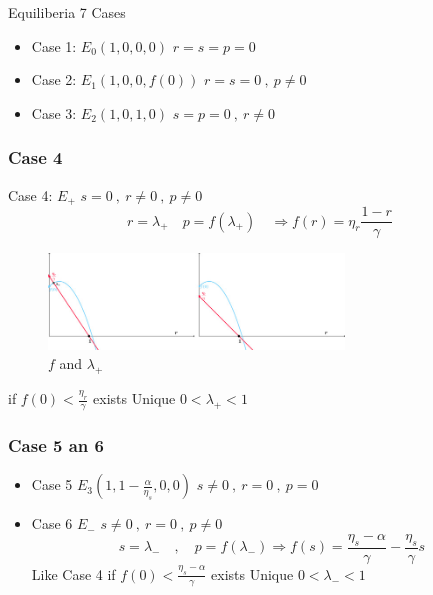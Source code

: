 \documentclass{beamer}
\begin{document}
\begin{frame}{Equiliberia}
  7 Cases 
\begin{itemize}
  \item Case 1: \(E_0 (1,0,0,0) \)   \(r = s = p = 0\)
  \item Case 2: \(E_1 (1,0,0,f(0)) \)   \( r = s = 0 \ , \ p \neq 0 \)
  \item Case 3: \(E_2 (1,0,1,0) \)   \( s = p = 0 \ , \ r \neq 0 \)
\end{itemize}
\end{frame}

\begin{frame}[shrink= 10]
  \frametitle{Case 4}
  Case 4: \(E_+ \)  \( s = 0 \ , \ r \neq 0 \ , \ p \neq 0 \) 
  \[ r = \lambda_+ \quad p = f(\lambda_+) \quad \Rightarrow f(r) = \eta_r \frac{1 - r}{\gamma} \]
  \vspace{-10mm}    
  \begin{figure}
      \includegraphics[width=0.7\textwidth]{1-s2.0-S1007570424005975-gr3.jpg}
      \caption{\(f\) and \(\lambda_+\) \cite{MOSTEFAOUI2025108412}}
  \end{figure}
  \vspace{-5mm}
  if \( f(0)  < \frac{\eta_r}{\gamma} \) exists Unique \( 0 < \lambda_+ < 1 \)  
\end{frame}

\begin{frame}
  \frametitle{Case 5 an 6 }
  \begin{itemize}
    \item Case 5 \(E_3(1,1-\frac{\alpha}{\eta_s},0,0)\)
   \(s \neq 0 \ , \ r = 0 \ , \ p = 0 \) 
    \item Case 6 \( E_- \) 
    \(s \neq 0 \ , \ r = 0 \ , \ p \neq 0 \) 
    \[ s = \lambda_- \quad , \quad p = f(\lambda_-) \Rightarrow f(s) = \frac{\eta_s- \alpha}{\gamma} - \frac{\eta_s}{\gamma}s\]
    Like Case 4 if \( f(0) < \frac{\eta_s- \alpha}{\gamma} \) exists Unique \( 0  < \lambda_- < 1 \) 
  \end{itemize}
\end{frame}
\end{document}
